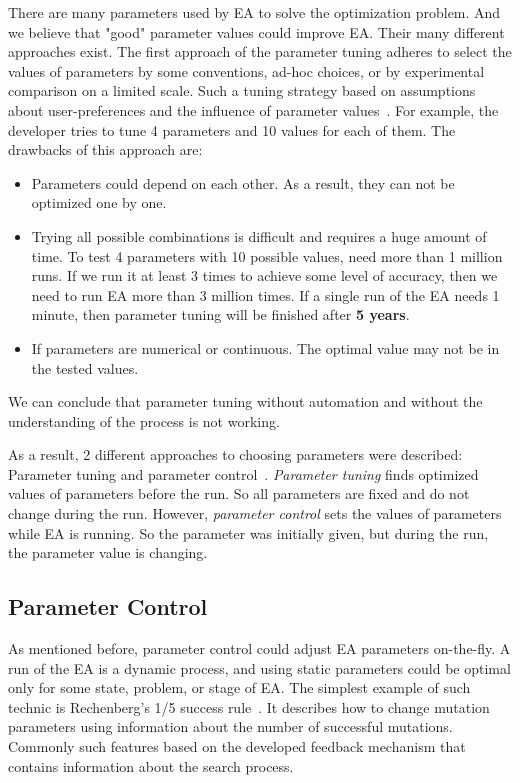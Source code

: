 There are many parameters used by EA to solve the optimization problem. And we believe that "good" parameter values could improve EA. Their many different approaches exist. 
The first approach of the parameter tuning adheres to select the values of parameters by some conventions, ad-hoc choices, or by experimental comparison on a limited scale. Such a tuning strategy based on assumptions about user-preferences and the influence of parameter values~\cite{eiben03,eiben11}. For example, the developer tries to tune 4 parameters and 10 values for each of them.
The drawbacks of this approach are:
\begin{itemize}
	\item Parameters could depend on each other. As a result, they can not be optimized one by one.
	\item Trying all possible combinations is difficult and requires a huge amount of time. To test 4 parameters with 10 possible values, need more than 1 million runs. If we run it at least 3 times to achieve some level of accuracy, then we need to run EA more than 3 million times. If a single run of the EA needs 1 minute, then parameter tuning will be finished after \textbf{5 years}. 
	\item If parameters are numerical or continuous. The optimal value may not be in the tested values.
\end{itemize}

We can conclude that parameter tuning without automation and without the understanding of the process is not working.

As a result, 2 different approaches to choosing parameters were described: Parameter tuning and parameter control~\cite{smit2012parameter,eiben03}.
\textit{Parameter tuning} finds optimized values of parameters before the run. So all parameters are fixed and do not change during the run. However, \textit{parameter control} sets the values of parameters while EA is running. So the parameter was initially given, but during the run, the parameter value is changing. 

\subsection{Parameter Control}
As mentioned before, parameter control could adjust EA parameters on-the-fly. A run of the EA is a dynamic process, and using static parameters could be optimal only for some state, problem, or stage of EA. 
The simplest example of such technic is Rechenberg's 1/5 success rule~\cite{rechenberg1973evolutionsstrategie}. It describes how to change mutation parameters using information about the number of successful mutations. Commonly such features based on the developed feedback mechanism that contains information about the search process.

